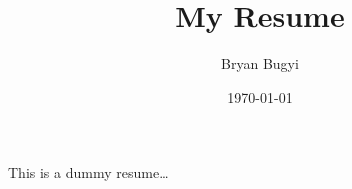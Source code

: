 \documentclass[12pt]{article}
\title{My Resume}
\author{Bryan Bugyi}
\date{\today}
\begin{document}
    \maketitle
    This is a dummy resume\ldots
\end{document}
